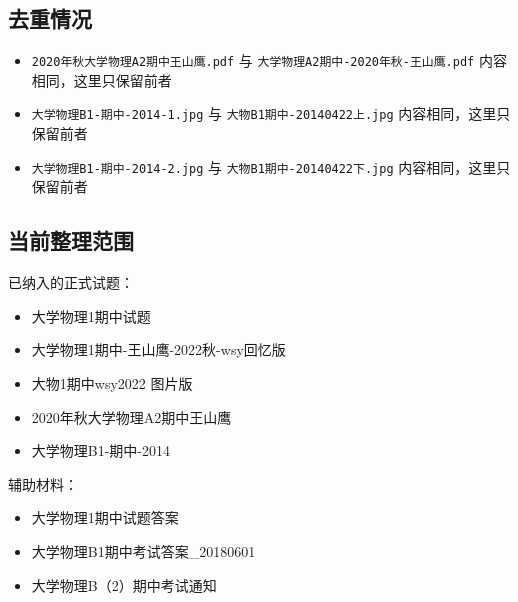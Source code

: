 \documentclass[12pt,a4paper]{ctexart}
\begin{document}
\subsection{去重情况}

\begin{itemize}

\item \texttt{2020年秋大学物理A2期中王山鹰.pdf} 与 \texttt{大学物理A2期中-2020年秋-王山鹰.pdf} 内容相同，这里只保留前者

\item \texttt{大学物理B1-期中-2014-1.jpg} 与 \texttt{大物B1期中-20140422上.jpg} 内容相同，这里只保留前者

\item \texttt{大学物理B1-期中-2014-2.jpg} 与 \texttt{大物B1期中-20140422下.jpg} 内容相同，这里只保留前者

\end{itemize}

\subsection{当前整理范围}

已纳入的正式试题：

\begin{itemize}

\item 大学物理1期中试题

\item 大学物理1期中-王山鹰-2022秋-wsy回忆版

\item 大物1期中wsy2022 图片版

\item 2020年秋大学物理A2期中王山鹰

\item 大学物理B1-期中-2014

\end{itemize}

辅助材料：

\begin{itemize}

\item 大学物理1期中试题答案

\item 大学物理B1期中考试答案\_20180601

\item 大学物理B（2）期中考试通知

\end{itemize}
\end{document}
